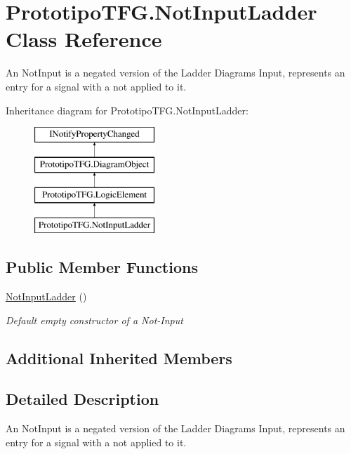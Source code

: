\hypertarget{class_prototipo_t_f_g_1_1_not_input_ladder}{}\section{Prototipo\+T\+F\+G.\+Not\+Input\+Ladder Class Reference}
\label{class_prototipo_t_f_g_1_1_not_input_ladder}


An Not\+Input is a negated version of the Ladder Diagram\textquotesingle{}s Input, represents an entry for a signal with a \textquotesingle{}not\textquotesingle{} applied to it.  


Inheritance diagram for Prototipo\+T\+F\+G.\+Not\+Input\+Ladder\+:\begin{figure}[H]
\begin{center}
\leavevmode
\includegraphics[height=4.000000cm]{class_prototipo_t_f_g_1_1_not_input_ladder}
\end{center}
\end{figure}
\subsection*{Public Member Functions}
\begin{DoxyCompactItemize}
\item 
\hyperlink{class_prototipo_t_f_g_1_1_not_input_ladder_a3251cfcde4ccefd21ac6db2dfb901b5f}{Not\+Input\+Ladder} ()
\begin{DoxyCompactList}\small\item\em Default empty constructor of a Not-\/\+Input \end{DoxyCompactList}\end{DoxyCompactItemize}
\subsection*{Additional Inherited Members}


\subsection{Detailed Description}
An Not\+Input is a negated version of the Ladder Diagram\textquotesingle{}s Input, represents an entry for a signal with a \textquotesingle{}not\textquotesingle{} applied to it. 




